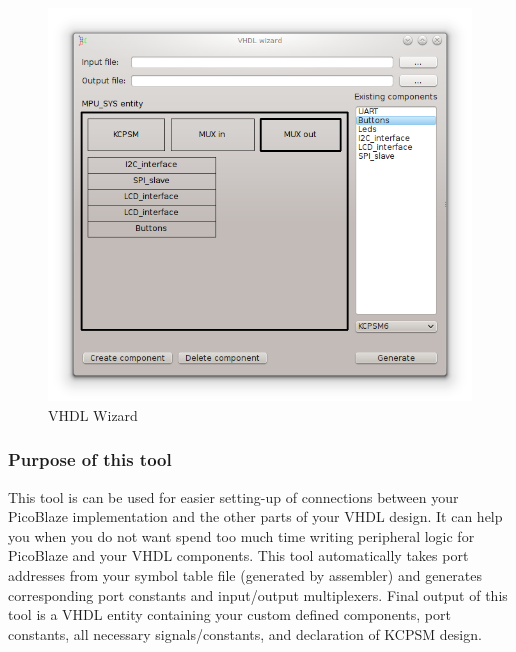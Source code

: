 \begin{figure}[h]
    \centering
    \includegraphics[width=.5\textwidth]{img/VHDL_wizard.png}
    \caption{VHDL Wizard}
\end{figure}

\subsubsection{Purpose of this tool}
    This tool is can be used for easier setting-up of connections between your PicoBlaze implementation and the other parts of your VHDL design. It can help you when you do not want spend too much time writing peripheral logic for PicoBlaze
    and your VHDL components. This tool automatically takes port addresses from your symbol table file (generated by assembler) and generates corresponding port constants and input/output multiplexers. Final output of
    this tool is a VHDL entity containing your custom defined components, port constants, all necessary signals/constants, and declaration of KCPSM design.

